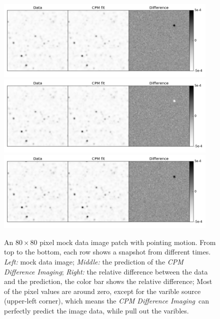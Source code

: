 \documentclass[12pt, preprint]{aastex}
\newcommand{\project}[1]{\textsl{#1}}
\newcommand{\cpmdiff}{\project{CPM Difference Imaging}}
\begin{document}
\begin{figure}[p]
\begin{center}
\includegraphics[width=0.95\textwidth]{f1a}
\includegraphics[width=0.95\textwidth]{f1b}
\includegraphics[width=0.95\textwidth]{f1c}
\end{center}
\caption{
  \label{space}
  An $80\times 80$ pixel mock data image patch with pointing motion. 
  From top to the bottom,  each row shows a snapshot from different times.
  \emph{Left:} mock data image;
  \emph{Middle:} the prediction of the \cpmdiff;
  \emph{Right:} the relative difference between the data and the prediction, the color bar shows the relative difference;
  Most of the pixel values are around zero, except for the varible source (upper-left corner), which means the \cpmdiff\ can perfectly predict the image data, while pull out the varibles.
}
\end{figure}
\end{document}
